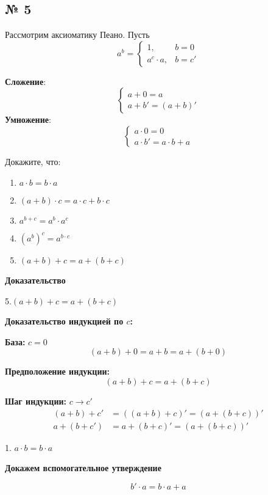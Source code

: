 \subsection{ № 5}

Рассмотрим аксиоматику Пеано. 
Пусть $$a^b = \left\{\begin{array}{ll}1,& b= 0 \\a^c\cdot a,&b = c'\end{array}\right.$$

\textbf{Сложение}:
$$
\begin{cases}
   a + 0 = a\\
    a + b' = (a + b)'
\end{cases}
$$
\textbf{Умножение}:
$$
\begin{cases}
    a \cdot 0 = 0\\
     a \cdot b' = a \cdot b + a
\end{cases}
$$

Докажите, что:
\begin{enumerate}
\item $a \cdot b = b \cdot a$



\item $(a + b) \cdot c = a \cdot c + b \cdot c$
\item $a^{b+c} = a^b \cdot a^c$
\item $(a^b)^c = a^{b \cdot c}$
\item $(a + b) + c = a + (b + c)$
\end{enumerate}


\textbf{Доказательство}

5.\((a + b) + c = a + (b + c)\)

\textbf{Доказательство индукцией по \( c \):}

\textbf{База:} \( c = 0 \)
  \[
  (a + b) + 0 = a + b = a + (b + 0)
  \]

\textbf{Предположение индукции:} 
  \[
  (a + b) + c = a + (b + c)
  \]

\textbf{Шаг индукции:} \( c \to c' \)
  \[
  \begin{aligned}
  (a + b) + c' &= ((a + b) + c)' = (a + (b + c))' \\
  a + (b + c') &= a + (b + c)' = (a + (b + c))'
  \end{aligned}
  \]


1. \( a \cdot b = b \cdot a \)

\textbf{Докажем вспомогательное утверждение}

$$b'\cdot a=b \cdot a + a $$

